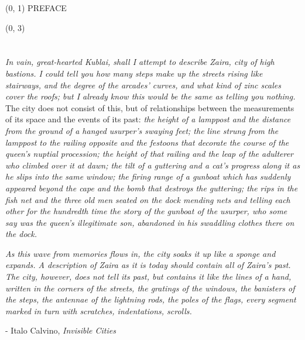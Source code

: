\documentclass[10pt]{article}
\begin{document}
\begin{textblock}{23} (0, 1)
\center\huge PREFACE
\end{textblock}

\begin{textblock}{8} (0, 3)

\section{}

\textit{In vain, great-hearted Kublai, shall I attempt to describe Zaira, city
of high bastions. I could tell you how many steps make up the streets rising
like stairways, and the degree of the arcades' curves, and what kind of zinc
scales cover the roofs; but I already know this would be the same as telling
you nothing.} The city does not consist of this, but of relationships between
the measurements of its space and the events of its past: \textit{the height of
a lamppost and the distance from the ground of a hanged usurper's swaying feet;
the line strung from the lamppost to the railing opposite and the festoons that
decorate the course of the queen's nuptial procession; the height of that
railing and the leap of the adulterer who climbed over it at dawn; the tilt of
a guttering and a cat's progress along it as he slips into the same window; the
firing range of a gunboat which has suddenly appeared beyond the cape and the
bomb that destroys the guttering; the rips in the fish net and the three old
men seated on the dock mending nets and telling each other for the hundredth
time the story of the gunboat of the usurper, who some say was the queen's
illegitimate son, abandoned in his swaddling clothes there on the dock.}

\textit{As this wave from memories flows in, the city soaks it up like a sponge
and expands. A description of Zaira as it is today should contain all of
Zaira's past. The city, however, does not tell its past, but contains it like
the lines of a hand, written in the corners of the streets, the gratings of the
windows, the banisters of the steps, the antennae of the lightning rods, the
poles of the flags, every segment marked in turn with scratches, indentations,
scrolls. }

- Italo Calvino, \emph{Invisible Cities}

\end{textblock}
\end{document}

